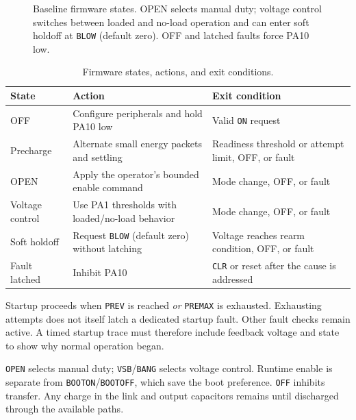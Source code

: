 \begin{figure}[htbp]
\endgroup
\caption{Baseline firmware states. OPEN selects manual duty; voltage control switches between loaded and no-load operation and can enter soft holdoff at \texttt{BLOW} (default zero). OFF and latched faults force PA10 low.}
\label{fig:ctrl-state-diagram}
\end{figure}

\begin{table}[htbp]
\centering
\caption{Firmware states, actions, and exit conditions.}
\label{tab:ctrl-state-machine}
\begin{tabularx}{\textwidth}{@{}p{}Xp{}@{}}
\toprule
State & Action & Exit condition\\
\midrule
OFF & Configure peripherals and hold PA10 low & Valid \texttt{ON} request\\
Precharge & Alternate small energy packets and settling & Readiness threshold or attempt limit, OFF, or fault\\
OPEN & Apply the operator's bounded enable command & Mode change, OFF, or fault\\
Voltage control & Use PA1 thresholds with loaded/no-load behavior & Mode change, OFF, or fault\\
Soft holdoff & Request \texttt{BLOW} (default zero) without latching & Voltage reaches rearm condition, OFF, or fault\\
Fault latched & Inhibit PA10 & \texttt{CLR} or reset after the cause is addressed\\
\bottomrule
\end{tabularx}
\end{table}

Startup proceeds when \texttt{PREV} is reached \emph{or} \texttt{PREMAX} is exhausted. Exhausting attempts does not itself latch a dedicated startup fault. Other fault checks remain active. A timed startup trace must therefore include feedback voltage and state to show why normal operation began.

\texttt{OPEN} selects manual duty; \texttt{VSB}/\texttt{BANG} selects voltage control. Runtime enable is separate from \texttt{BOOTON}/\texttt{BOOTOFF}, which save the boot preference. \texttt{OFF} inhibits transfer. Any charge in the link and output capacitors remains until discharged through the available paths.
